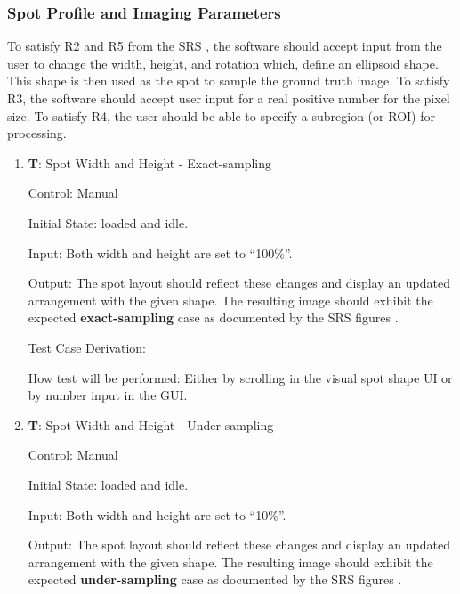 \documentclass[12pt, titlepage]{article}
\newcounter{testnum} %
\begin{document}
\subsubsection{Spot Profile and Imaging Parameters} \label{subsec_spot}

To satisfy R2 and R5 from the SRS \citep{SRS}, the software should accept input from the user
to change the width, height, and rotation which, define an ellipsoid shape. 
This shape is then used as the spot to sample the ground truth image.
To satisfy R3, the software should accept user input for a real positive number for the pixel size.
To satisfy R4, the user should be able to specify a subregion (or ROI) for processing.

\begin{enumerate}

  \item{\textbf{T\thetestnum \label{T_spotSize}}: Spot Width and Height - Exact-sampling\\}

    Control: Manual
              
    Initial State: \progname{} loaded and idle.
              
    Input: Both width and height are set to ``100\%''.
              
    Output: The spot layout should reflect these changes and display an updated arrangement with the given shape.
    The resulting image should exhibit the expected \textbf{exact-sampling} case as documented by the SRS figures \citep{SRS}.

    Test Case Derivation: 
              
    How test will be performed: Either by scrolling in the visual spot shape UI or by number input in the GUI.
					
    \item{\textbf{T\thetestnum \label{T_spotSize10}}: Spot Width and Height - Under-sampling\\}

    Control: Manual
              
    Initial State: \progname{} loaded and idle.
              
    Input: Both width and height are set to ``10\%''.
              
    Output: The spot layout should reflect these changes and display an updated arrangement with the given shape.
    The resulting image should exhibit the expected \textbf{under-sampling} case as documented by the SRS figures \citep{SRS}.


\end{enumerate}
\end{document}
